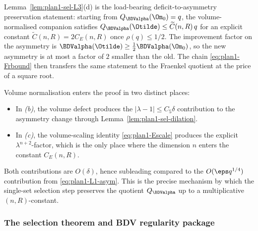 \begin{remark}
\label{rmk:plan1-sel-ratio}
Lemma~\ref{lem:plan1-sel-L3}(d) is the load-bearing
deficit-to-asymmetry preservation statement: starting from
$Q_{\BDValpha}(\Om_0)=q$, the volume-normalised companion satisfies
$Q_{\BDValpha}(\Otilde)\le \widetilde C(n,R)\,q$ for an explicit constant
$\widetilde C(n,R)=2C_E(n,R)$ once $\rho(q)\le 1/2$. The improvement
factor on the asymmetry is
$\BDValpha(\Otilde)\ge \tfrac12\BDValpha(\Om_0)$, so the new asymmetry
is at most a factor of $2$ smaller than the old. The chain
\eqref{eq:plan1-Frbound} then transfers the same statement to the
Fraenkel quotient at the price of a square root.

Volume normalisation enters the proof in two distinct places:
\begin{itemize}
\item In \emph{(b)}, the volume defect produces the
$|\lambda-1|\le C_5\delta$ contribution to the asymmetry change
through Lemma~\ref{lem:plan1-sel-dilation}.
\item In \emph{(c)}, the volume-scaling identity
\eqref{eq:plan1-Escale} produces the explicit
$\lambda^{n+2}$-factor, which is the only place where the dimension
$n$ enters the constant $C_E(n,R)$.
\end{itemize}
Both contributions are $O(\delta)$, hence subleading compared to the
$O(\eps q^{1/4})$ contribution from
\eqref{eq:plan1-L1-asym}. This is the precise mechanism by which the
single-set selection step preserves the quotient $Q_{\BDValpha}$ up to a
multiplicative $(n,R)$-constant.
\end{remark}

\medskip

\subsubsection{The selection theorem and BDV regularity package}
\label{subsubsec:plan1-sel-thm}

